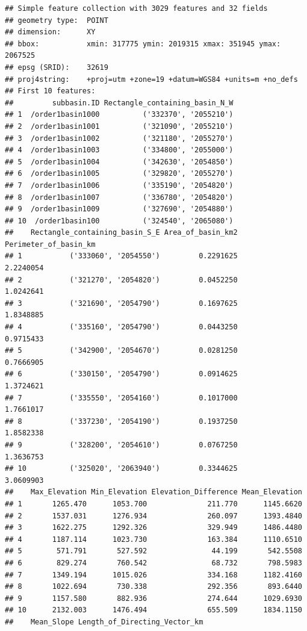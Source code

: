 \documentclass[11pt,]{article}
\begin{document}
\begin{verbatim}
## Simple feature collection with 3029 features and 32 fields
## geometry type:  POINT
## dimension:      XY
## bbox:           xmin: 317775 ymin: 2019315 xmax: 351945 ymax: 2067525
## epsg (SRID):    32619
## proj4string:    +proj=utm +zone=19 +datum=WGS84 +units=m +no_defs
## First 10 features:
##         subbasin.ID Rectangle_containing_basin_N_W
## 1  /order1basin1000          ('332370', '2055210')
## 2  /order1basin1001          ('321090', '2055210')
## 3  /order1basin1002          ('321180', '2055270')
## 4  /order1basin1003          ('334800', '2055000')
## 5  /order1basin1004          ('342630', '2054850')
## 6  /order1basin1005          ('329820', '2055270')
## 7  /order1basin1006          ('335190', '2054820')
## 8  /order1basin1007          ('336780', '2054820')
## 9  /order1basin1009          ('327690', '2054880')
## 10  /order1basin100          ('324540', '2065080')
##    Rectangle_containing_basin_S_E Area_of_basin_km2 Perimeter_of_basin_km
## 1           ('333060', '2054550')         0.2291625             2.2240054
## 2           ('321270', '2054820')         0.0452250             1.0242641
## 3           ('321690', '2054790')         0.1697625             1.8348885
## 4           ('335160', '2054790')         0.0443250             0.9715433
## 5           ('342900', '2054670')         0.0281250             0.7666905
## 6           ('330150', '2054790')         0.0914625             1.3724621
## 7           ('335550', '2054160')         0.1017000             1.7661017
## 8           ('337230', '2054190')         0.1937250             1.8582338
## 9           ('328200', '2054610')         0.0767250             1.3636753
## 10          ('325020', '2063940')         0.3344625             3.0609903
##    Max_Elevation Min_Elevation Elevation_Difference Mean_Elevation
## 1       1265.470      1053.700              211.770      1145.6620
## 2       1537.031      1276.934              260.097      1393.4840
## 3       1622.275      1292.326              329.949      1486.4480
## 4       1187.114      1023.730              163.384      1110.6510
## 5        571.791       527.592               44.199       542.5508
## 6        829.274       760.542               68.732       798.5983
## 7       1349.194      1015.026              334.168      1182.4160
## 8       1022.694       730.338              292.356       893.6440
## 9       1157.580       882.936              274.644      1029.6930
## 10      2132.003      1476.494              655.509      1834.1150
##    Mean_Slope Length_of_Directing_Vector_km

\end{verbatim}
\end{document}
